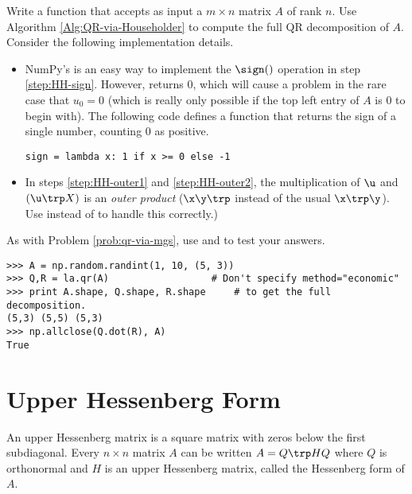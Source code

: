 \begin{problem} %
Write a function that accepts as input a $m \times n$ matrix $A$ of rank $n$.
Use Algorithm \ref{Alg:QR-via-Householder} to compute the full QR decomposition of $A$.
Consider the following implementation details.
\begin{itemize}

\item NumPy's  is an easy way to implement the $\sign()$ operation in step \ref{step:HH-sign}.
However,  returns $0$, which will cause a problem in the rare case that $u_0 = 0$ (which is really only possible if the top left entry of $A$ is $0$ to begin with).
The following code defines a function that returns the sign of a single number, counting $0$ as positive.

\begin{lstlisting}
sign = lambda x: 1 if x >= 0 else -1
\end{lstlisting}

\item In steps \ref{step:HH-outer1} and \ref{step:HH-outer2}, the multiplication of $\u$ and $(\u\trp X)$ is an \emph{outer product} ($\x\y\trp$ instead of the usual $\x\trp\y$).
Use  instead of  to handle this correctly.)

\end{itemize}

As with Problem \ref{prob:qr-via-mgs}, use  and  to test your answers.

\begin{lstlisting}
>>> A = np.random.randint(1, 10, (5, 3))
>>> Q,R = la.qr(A)                  # Don't specify method="economic"
>>> print A.shape, Q.shape, R.shape     # to get the full decomposition.
(5,3) (5,5) (5,3)
>>> np.allclose(Q.dot(R), A)
True
\end{lstlisting}
\label{prob:qr-via-hessenberg}
\end{problem}

\section*{Upper Hessenberg Form} %

An upper Hessenberg matrix is a square matrix with zeros below the first subdiagonal.
Every  $n \times n$ matrix $A$ can be written $A = Q\trp HQ$ where $Q$ is orthonormal and $H$ is an upper Hessenberg matrix, called the Hessenberg form of $A$.

